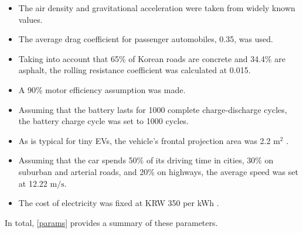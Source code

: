 \documentclass[11pt,twocolumn]{article}
\begin{document}
                \begin{itemize}
                    \item The air density and gravitational acceleration were taken from widely known values.
                    \item The average drag coefficient for passenger automobiles, 0.35, was used\cite{35coefficient}.
                    \item Taking into account that 65\% of Korean roads are concrete and 34.4\% are asphalt, the rolling resistance coefficient was calculated at 0.015.\cite{65perconcreteand344percentasphalt}
                    \item A 90\% motor efficiency assumption was made\cite{90percentefficiency}.
                    \item Assuming that the battery lasts for 1000 complete charge-discharge cycles, the battery charge cycle was set to 1000 cycles\cite{lifecycle1000}.
                    \item As is typical for tiny EVs, the vehicle's frontal projection area  was 2.2 $\mathrm{m^2}$ \cite{Frontalarea22}.
                    \item Assuming that the car spends 50\% of its driving time in cities, 30\% on suburban and arterial roads, and 20\% on highways, the average speed was set at 12.22 $\mathrm{m/s}$.
                    \item The cost of electricity was fixed at KRW 350 per kWh \cite{350won}.
                \end{itemize}
                In total, \cref{params} provides a summary of these parameters.
\end{document}
